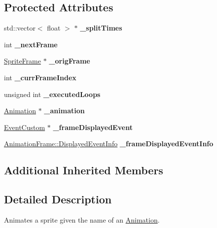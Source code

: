 \subsection*{Protected Attributes}
\begin{DoxyCompactItemize}
\item 
\mbox{\label{classAnimate_a92881310fa61c0d0b4d9f573d19ac758}} 
std\+::vector$<$ float $>$ $\ast$ {\bfseries \+\_\+split\+Times}
\item 
\mbox{\label{classAnimate_a8fec3566e81c301e1db41b6b253be482}} 
int {\bfseries \+\_\+next\+Frame}
\item 
\mbox{\label{classAnimate_a6a71aaddf71b16672e1548571f74e607}} 
\hyperlink{classSpriteFrame}{Sprite\+Frame} $\ast$ {\bfseries \+\_\+orig\+Frame}
\item 
\mbox{\label{classAnimate_a8f41b398b9fe818c78527d067722a354}} 
int {\bfseries \+\_\+curr\+Frame\+Index}
\item 
\mbox{\label{classAnimate_a62c72ab7317d264f3d6ac867c06727b9}} 
unsigned int {\bfseries \+\_\+executed\+Loops}
\item 
\mbox{\label{classAnimate_ad032ead08266ec22681d6fd851f59478}} 
\hyperlink{classAnimation}{Animation} $\ast$ {\bfseries \+\_\+animation}
\item 
\mbox{\label{classAnimate_aa8573c82d7791f5aac3ced61db60a1c7}} 
\hyperlink{classEventCustom}{Event\+Custom} $\ast$ {\bfseries \+\_\+frame\+Displayed\+Event}
\item 
\mbox{\label{classAnimate_a3498466a50792c658d78a2de847eb548}} 
\hyperlink{structAnimationFrame_1_1DisplayedEventInfo}{Animation\+Frame\+::\+Displayed\+Event\+Info} {\bfseries \+\_\+frame\+Displayed\+Event\+Info}
\end{DoxyCompactItemize}
\subsection*{Additional Inherited Members}


\subsection{Detailed Description}
Animates a sprite given the name of an \hyperlink{classAnimation}{Animation}. 

